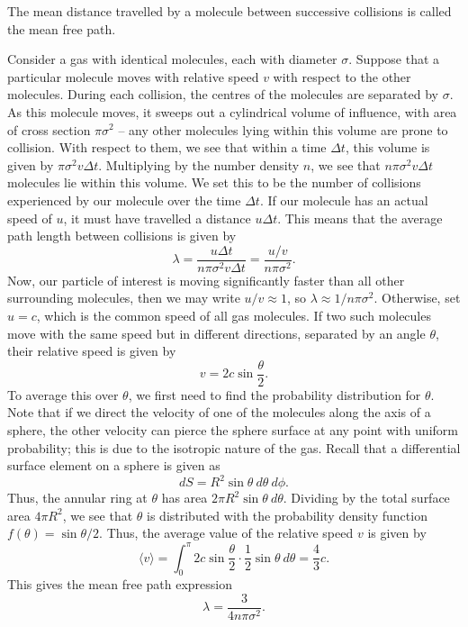 \documentclass[11pt]{article}
\newcommand\E[1]{\langle #1 \rangle}
\theoremstyle{definition}
\theoremstyle{remark}
\numberwithin{equation}{section}
\begin{document}
    \begin{definition}
        The mean distance travelled by a molecule between successive collisions is
        called the mean free path.
    \end{definition}

    Consider a gas with identical molecules, each with diameter $\sigma$.
    Suppose that a particular molecule moves with relative speed $v$ with respect to
    the other molecules. During each collision, the centres of the molecules are
    separated by $\sigma$. As this molecule moves, it sweeps out a cylindrical
    volume of influence, with area of cross section $\pi \sigma^2$ -- any other
    molecules lying within this volume are prone to collision. With respect to them,
    we see that within a time $\Delta t$, this volume is given by $\pi \sigma^2
    v\Delta t$. Multiplying by the number density $n$, we see that $n\pi\sigma^2
    v\Delta t$ molecules lie within this volume. We set this to be the number of
    collisions experienced by our molecule over the time $\Delta t$. If our molecule
    has an actual speed of $u$, it must have travelled a distance $u \Delta t$. This
    means that the average path length between collisions is given by \[
        \lambda = \frac{u\Delta t}{n\pi \sigma^2 v \Delta t} = \frac{u /
        v}{n\pi\sigma^2}.
    \] Now, our particle of interest is moving significantly faster than all other
    surrounding molecules, then we may write $u /v \approx 1$, so $\lambda \approx
    1 /n\pi\sigma^2$. Otherwise, set $u = c$, which is the common speed of all
    gas molecules. If two such molecules move with the same speed but in different
    directions, separated by an angle $\theta$, their relative speed is given by \[
        v = 2c\sin\frac{\theta}{2}.
    \] To average this over $\theta$, we first need to find the probability
    distribution for $\theta$. Note that if we direct the velocity of one of the
    molecules along the axis of a sphere, the other velocity can pierce the sphere
    surface at any point with uniform probability; this is due to the isotropic
    nature of the gas. Recall that a differential surface element on a sphere is
    given as \[
        dS = R^2\sin\theta \:d\theta \:d\phi.
    \] Thus, the annular ring at $\theta$ has area $2\pi R^2 \sin\theta \:d\theta$.
    Dividing by the total surface area $4\pi R^2$, we see that $\theta$ is
    distributed with the probability density function $f(\theta) = \sin\theta /2$.
    Thus, the average value of the relative speed $v$ is given by \[
        \E{v} = \int_0^\pi 2c \sin\frac{\theta}{2}\cdot \frac{1}{2} \sin\theta 
        \:d\theta = \frac{4}{3}c.
    \] This gives the mean free path expression \[
        \lambda = \frac{3}{4n\pi\sigma^2}.
    \] 
\end{document}
